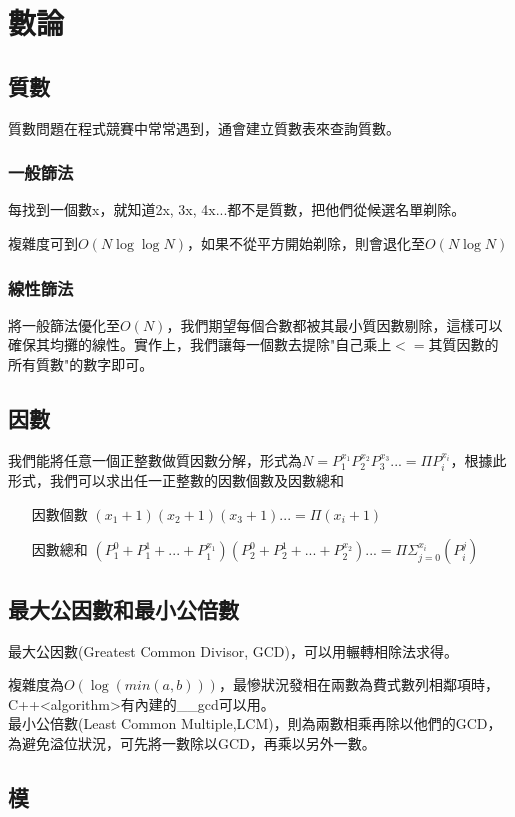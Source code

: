 \section{數論}
\subsection{質數}
質數問題在程式競賽中常常遇到，通會建立質數表來查詢質數。
\subsubsection{一般篩法}
每找到一個數x，就知道2x, 3x, 4x...都不是質數，把他們從候選名單剃除。

複雜度可到$O(N\log\log N)$，如果不從平方開始剃除，則會退化至$O(N\log N)$
\subsubsection{線性篩法}
將一般篩法優化至$O(N)$，我們期望每個合數都被其最小質因數剔除，這樣可以確保其均攤的線性。實作上，我們讓每一個數去提除"自己乘上$<=$其質因數的所有質數"的數字即可。

\subsection{因數}
我們能將任意一個正整數做質因數分解，形式為$N=P_{1}^{x_{1}}P_{2}^{x_{2}}P_{3}^{x_{3}}...=\Pi P_{i}^{x_{i}}$，根據此形式，我們可以求出任一正整數的因數個數及因數總和
\begin{enumerate}
\item [因數個數] $(x_{1}+1)(x_{2}+1)(x_{3}+1)...=\Pi (x_{i}+1)$
\item [因數總和] $(P_{1}^{0}+P_{1}^{1}+...+P_{1}^{x_{1}})(P_{2}^{0}+P_{2}^{1}+...+P_{2}^{x_{2}})...=\Pi\Sigma_{j=0}^{x_{i}}(P_{i}^{j})$
\end{enumerate}
\subsection{最大公因數和最小公倍數}
最大公因數(Greatest Common Divisor, GCD)，可以用輾轉相除法求得。

複雜度為$O(\log(min(a,b)))$，最慘狀況發相在兩數為費式數列相鄰項時，C++<algorithm>有內建的\_\_gcd可以用。\\
最小公倍數(Least Common Multiple,LCM)，則為兩數相乘再除以他們的GCD，為避免溢位狀況，可先將一數除以GCD，再乘以另外一數。
\subsection{模}
